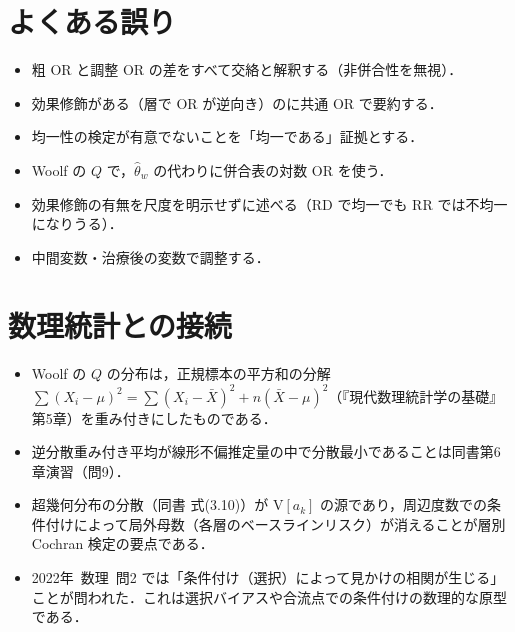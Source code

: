 \documentclass[a4paper,11pt,openany]{ltjsbook}
\newcommand{\kakomonSM}[2]{\mbox{#1年 数理 問#2}}
\newcommand{\V}{\mathrm{V}}
\begin{document}
\section{よくある誤り}\label{sec:07-err}
\begin{warnbox}
\begin{itemize}
\item 粗 OR と調整 OR の差をすべて交絡と解釈する（非併合性を無視）．
\item 効果修飾がある（層で OR が逆向き）のに共通 OR で要約する．
\item 均一性の検定が有意でないことを「均一である」証拠とする．
\item Woolf の $Q$ で，$\hat\theta_w$ の代わりに併合表の対数 OR を使う．
\item 効果修飾の有無を尺度を明示せずに述べる（RD で均一でも RR では不均一になりうる）．
\item 中間変数・治療後の変数で調整する．
\end{itemize}
\end{warnbox}

\section{数理統計との接続}\label{sec:07-link}
\begin{linkbox}
\begin{itemize}
\item Woolf の $Q$ の分布は，正規標本の平方和の分解 $\sum(X_i-\mu)^2=\sum(X_i-\bar X)^2+n(\bar X-\mu)^2$（『現代数理統計学の基礎』第5章）を重み付きにしたものである．
\item 逆分散重み付き平均が線形不偏推定量の中で分散最小であることは同書第6章演習（問9）．
\item 超幾何分布の分散（同書 式(3.10)）が $\V[a_k]$ の源であり，周辺度数での条件付けによって局外母数（各層のベースラインリスク）が消えることが層別 Cochran 検定の要点である．
\item \kakomonSM{2022}{2} では「条件付け（選択）によって見かけの相関が生じる」ことが問われた．これは選択バイアスや合流点での条件付けの数理的な原型である．
\end{itemize}
\end{linkbox}
\end{document}
